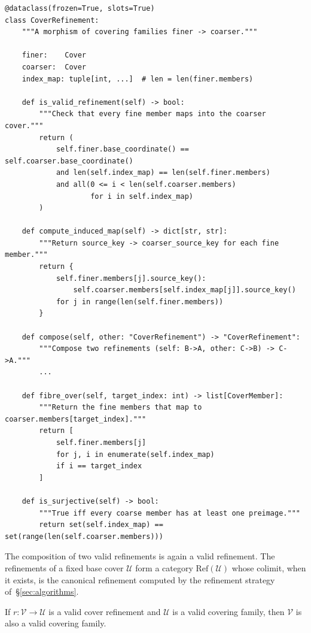 \documentclass[11pt]{article}
\begin{document}
\begin{lstlisting}[style=jugeo-python,
  caption={\texttt{CoverRefinement} from \texttt{src/jugeo/geometry/covers.py}.},
  label={lst:refinement}]
@dataclass(frozen=True, slots=True)
class CoverRefinement:
    """A morphism of covering families finer -> coarser."""

    finer:    Cover
    coarser:  Cover
    index_map: tuple[int, ...]  # len = len(finer.members)

    def is_valid_refinement(self) -> bool:
        """Check that every fine member maps into the coarser cover."""
        return (
            self.finer.base_coordinate() == self.coarser.base_coordinate()
            and len(self.index_map) == len(self.finer.members)
            and all(0 <= i < len(self.coarser.members)
                    for i in self.index_map)
        )

    def compute_induced_map(self) -> dict[str, str]:
        """Return source_key -> coarser_source_key for each fine member."""
        return {
            self.finer.members[j].source_key():
                self.coarser.members[self.index_map[j]].source_key()
            for j in range(len(self.finer.members))
        }

    def compose(self, other: "CoverRefinement") -> "CoverRefinement":
        """Compose two refinements (self: B->A, other: C->B) -> C->A."""
        ...

    def fibre_over(self, target_index: int) -> list[CoverMember]:
        """Return the fine members that map to coarser.members[target_index]."""
        return [
            self.finer.members[j]
            for j, i in enumerate(self.index_map)
            if i == target_index
        ]

    def is_surjective(self) -> bool:
        """True iff every coarse member has at least one preimage."""
        return set(self.index_map) == set(range(len(self.coarser.members)))
\end{lstlisting}

The composition of two valid refinements is again a valid refinement.
The refinements of a fixed base cover $\mathcal{U}$ form a category
$\mathrm{Ref}(\mathcal{U})$ whose colimit, when it exists, is the
canonical refinement computed by the refinement strategy
of~\S\ref{sec:algorithms}.

\begin{lemma}
\label{lem:refinement-valid}
If $r : \mathcal{V} \to \mathcal{U}$ is a valid cover refinement
and $\mathcal{U}$ is a valid covering family, then $\mathcal{V}$ is
also a valid covering family.
\end{lemma}
\end{document}
